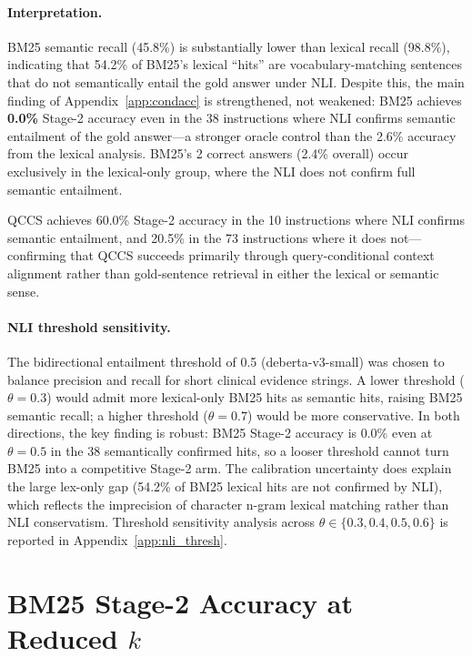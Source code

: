 \documentclass{article}
\begin{document}
\paragraph{Interpretation.}
BM25 semantic recall (45.8\%) is substantially lower than lexical recall (98.8\%),
indicating that 54.2\% of BM25's lexical ``hits'' are vocabulary-matching sentences
that do not semantically entail the gold answer under NLI. Despite this, the
main finding of Appendix~\ref{app:condacc} is strengthened, not weakened:
BM25 achieves \textbf{0.0\%} Stage-2 accuracy even in the 38 instructions where
NLI confirms semantic entailment of the gold answer---a stronger oracle control
than the 2.6\% accuracy from the lexical analysis. BM25's 2 correct answers
(2.4\% overall) occur exclusively in the lexical-only group, where the NLI
does not confirm full semantic entailment.

QCCS achieves 60.0\% Stage-2 accuracy in the 10 instructions where NLI confirms
semantic entailment, and 20.5\% in the 73 instructions where it does not---confirming
that QCCS succeeds primarily through query-conditional context alignment rather
than gold-sentence retrieval in either the lexical or semantic sense.

\paragraph{NLI threshold sensitivity.}
The bidirectional entailment threshold of 0.5 (deberta-v3-small) was chosen to
balance precision and recall for short clinical evidence strings. A lower threshold
($\theta = 0.3$) would admit more lexical-only BM25 hits as semantic hits, raising
BM25 semantic recall; a higher threshold ($\theta = 0.7$) would be more conservative.
In both directions, the key finding is robust: BM25 Stage-2 accuracy is 0.0\% even
at $\theta = 0.5$ in the 38 semantically confirmed hits, so a looser threshold
cannot turn BM25 into a competitive Stage-2 arm. The calibration uncertainty does
explain the large lex-only gap (54.2\% of BM25 lexical hits are not confirmed by
NLI), which reflects the imprecision of character n-gram lexical matching rather
than NLI conservatism. Threshold sensitivity analysis across $\theta \in \{0.3,
0.4, 0.5, 0.6\}$ is reported in Appendix~\ref{app:nli_thresh}.


\section{BM25 Stage-2 Accuracy at Reduced $k$}
\label{app:ksweep}
\end{document}
